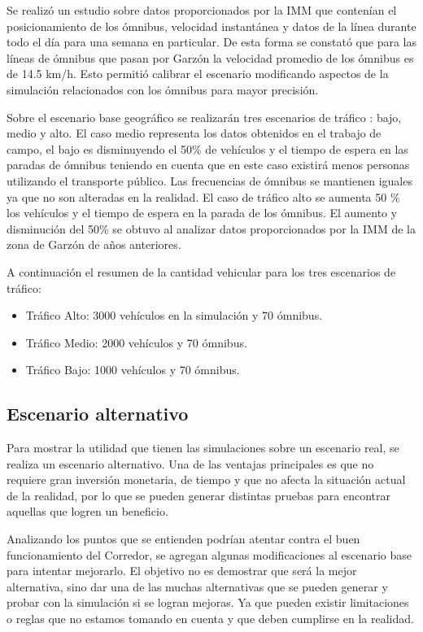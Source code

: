 Se realizó un estudio sobre datos proporcionados por la IMM que contenían el posicionamiento de los ómnibus, velocidad instantánea y datos de la línea durante todo el día para una semana en particular. De esta forma se constató que para las líneas de ómnibus que pasan por Garzón la velocidad promedio de los ómnibus es de 14.5 km/h. Esto permitió calibrar el escenario modificando aspectos de la simulación relacionados con los ómnibus para mayor precisión.

Sobre el escenario base geográfico se realizarán tres escenarios de tráfico : bajo, medio y alto. El caso medio representa los datos obtenidos en el trabajo de campo, el bajo es disminuyendo el 50\% de vehículos y el tiempo de espera en las paradas de ómnibus teniendo en cuenta que en este caso existirá menos personas utilizando el transporte público. Las frecuencias de ómnibus se mantienen iguales ya que no son alteradas en la realidad. El caso de tráfico alto se aumenta 50 \%  los vehículos y el tiempo de espera en la parada de los ómnibus. El aumento y disminución del 50\% se obtuvo al analizar datos proporcionados por la IMM de la zona de Garzón de años anteriores. \newline

A continuación el resumen de la cantidad vehicular para los tres escenarios de tráfico:

\begin{itemize}
\item Tráfico Alto:  3000 vehículos en la simulación y 70 ómnibus. 
\item Tráfico Medio: 2000 vehículos y 70 ómnibus.
\item Tráfico Bajo:  1000 vehículos y 70 ómnibus.
\end{itemize}

 

\subsection{Escenario alternativo}

Para mostrar la utilidad que tienen las simulaciones sobre un escenario real, se realiza un escenario alternativo. Una de las ventajas principales es que no requiere gran inversión monetaria, de tiempo y que no afecta la situación actual de la realidad, por lo que se pueden generar distintas pruebas para encontrar aquellas que logren un beneficio.

Analizando los puntos que se entienden podrían atentar contra el buen funcionamiento del Corredor, se agregan algunas modificaciones al escenario base para intentar mejorarlo. El objetivo no es demostrar que será la mejor alternativa, sino dar una de las muchas alternativas que se pueden generar y probar con la simulación si se logran mejoras. Ya que pueden existir limitaciones o reglas que no estamos tomando en cuenta y que deben cumplirse en la realidad.

